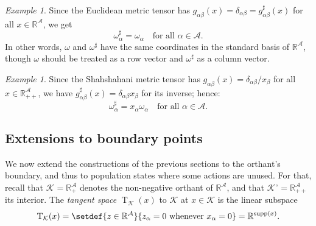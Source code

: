 \documentclass[reqno]{amsart}
\theoremstyle{plain}
\theoremstyle{definition}
\theoremstyle{remark}
\newtheorem{example}[theorem]{Example}
\numberwithin{equation}{section}
\numberwithin{theorem}{section}
\begin{document}
\begin{example}
Since the Euclidean metric tensor has $g_{\alpha\beta}(x) = \delta_{\alpha\beta} = g_{\alpha\beta}^{\sharp}(x)$ for all $x\in{\mathbb{R}}^{\mathcal{A}}$, we get
\begin{equation}
\label{eq:sharp-Eucl}
\omega_{\alpha}^{\sharp}
	= \omega_{\alpha}
	\quad
	\text{for all $\alpha\in{\mathcal{A}}$.}
\end{equation}
In other words, $\omega$ and $\omega^{\sharp}$ have the same coordinates
in the standard basis of ${\mathbb{R}}^{\mathcal{A}}$,
though $\omega$ should be treated as a row vector and $\omega^{\sharp}$ as a column vector.
\end{example}

\begin{example}
Since the Shahshahani metric tensor has $g_{\alpha\beta}(x) = \delta_{\alpha\beta}/x_{\beta}$ for all $x\in{\mathbb{R}}_{++}^{\mathcal{A}}$, we have $g_{\alpha\beta}^{\sharp}(x) = \delta_{\alpha\beta} x_{\beta}$ for its inverse;
hence:
\begin{equation}
\label{eq:sharp-Shah}
\omega_{\alpha}^{\sharp}
	= x_{\alpha} \omega_{\alpha}
	\quad
	\text{for all $\alpha\in{\mathcal{A}}$.}
\end{equation}
\end{example}

\subsection{Extensions to boundary points}
\label{sec:boundary}

We now extend the constructions of the previous sections to the orthant's boundary, and thus to population states where some actions are unused.
For that, recall that ${\mathcal{K}} = {\mathbb{R}}_{+}^{\mathcal{A}}$ denotes the non-negative orthant of ${\mathbb{R}}^{\mathcal{A}}$, and that ${{\mathcal{K}}^{\circ}} = {\mathbb{R}}_{++}^{\mathcal{A}}$ its interior.
The \emph{tangent space} $\operatorname{T}_{\mathcal{K}}(x)$ to ${\mathcal{K}}$ at $x\in{\mathcal{K}}$ is the linear subspace
\begin{equation}
\label{eq:tspace-orth}
\operatorname{T}_{\mathcal{K}}(x)
	
	= \setdef{z\in{\mathbb{R}}^{\mathcal{A}}}{z_\alpha = 0\text{ whenever }x_\alpha=0}
	= {\mathbb{R}}^{\operatorname{supp}(x)}.
\end{equation}
\end{document}
